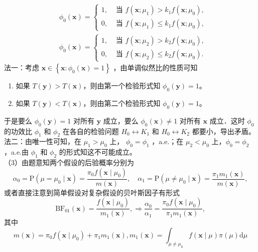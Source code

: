 \documentclass[UTF8,openany]{book}
\begin{document}
	$$
	\begin{aligned}
		& \phi_0(\boldsymbol{x})= \begin{cases}1, & \text { 当 } f\left(\boldsymbol{x} ; \mu_1\right)>k_1 f\left(\boldsymbol{x} ; \mu_0\right), \\
			0, & \text { 当 } f\left(\boldsymbol{x} ; \mu_1\right) \leq k_1 f\left(\boldsymbol{x} ; \mu_0\right),\end{cases} \\
		& \phi_0(\boldsymbol{x})= \begin{cases}1, & \text { 当 } f\left(\boldsymbol{x} ; \mu_2\right)>k_2 f\left(\boldsymbol{x} ; \mu_0\right), \\
			0, & \text { 当 } f\left(\boldsymbol{x} ; \mu_2\right) \leq k_2 f\left(\boldsymbol{x} ; \mu_0\right) .\end{cases}
	\end{aligned}
	$$
	法一：考虑 $\boldsymbol{x} \in\left\{\boldsymbol{x}: \phi_0(\boldsymbol{x})=1\right\}$ ，由单调似然比的性质可知
	\begin{enumerate}[label=\textbf{\textbullet}]
		\item 如果 $T(\boldsymbol{y})>T(\boldsymbol{x})$，则由第一个检验形式知 $\phi_0(\boldsymbol{y})=1$。
		\item 如果 $T(\boldsymbol{y})<T(\boldsymbol{x})$，则由第二个检验形式知 $\phi_0(\boldsymbol{y})=1$。
	\end{enumerate}
	于是要么 $\phi_0(\boldsymbol{y})=1$ 对所有 $\boldsymbol{y}$ 成立，要么 $\phi_0(\boldsymbol{x}) \neq 1$ 对所有 $\boldsymbol{x}$ 成立．这时 $\phi_0$ 的功效比 $\phi_1$ 和 $\phi_2$ 在各自的检验问题 $H_0 \leftrightarrow K_1$ 和 $H_0 \leftrightarrow K_2$ 都要小，导出矛盾。\\
	法二：由唯一性可知，在 $\mu_1>\mu_0$ 上， $\phi_0=\phi_1$ ，a.e.；在 $\mu_2<\mu_0$ 上，$\phi_0=\phi_2$ ，a.e.由 $\phi_1$ 和 $\phi_2$ 的形式知这不可能成立。\\
	（3）由题意知两个假设的后验概率分别为
	$$
	\alpha_0=\mathrm{P}\left(\mu=\mu_0 \mid \boldsymbol{x}\right)=\frac{\pi_0 f\left(\boldsymbol{x} \mid \mu_0\right)}{m(\boldsymbol{x})}, \quad \alpha_1=\mathrm{P}\left(\mu \neq \mu_0 \mid \boldsymbol{x}\right)=\frac{\pi_1 m_1(\boldsymbol{x})}{m(\boldsymbol{x})},
	$$
	或者直接注意到简单假设对复杂假设的贝叶斯因子有形式
	$$
	\mathrm{BF}_{01}(\boldsymbol{x})=\frac{f\left(\boldsymbol{x} \mid \mu_0\right)}{m_1(\boldsymbol{x})}, \Longrightarrow \frac{\alpha_0}{\alpha_1}=\frac{\pi_0 f\left(\boldsymbol{x} \mid \mu_0\right)}{\pi_1 m_1(\boldsymbol{x})},
	$$
	其中 
	$$m(\boldsymbol{x})=\pi_0 f\left(\boldsymbol{x} \mid \mu_0\right)+\pi_1 m_1(\boldsymbol{x}), m_1(\boldsymbol{x})=\int_{\mu \neq \mu_0} f(\boldsymbol{x} \mid \mu) \pi(\mu) \mathrm{d} \mu$$
\end{document}

